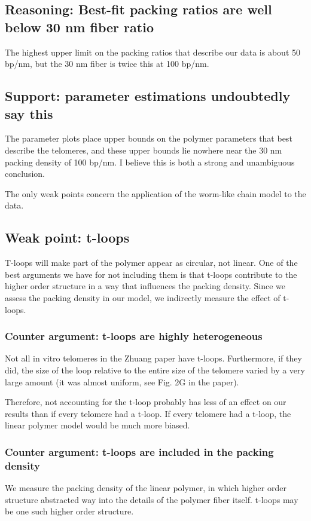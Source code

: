 \documentclass[12pt, a4paper]{article}
\begin{document}
\subsection{Reasoning: Best-fit packing ratios are well below 30 nm fiber ratio}
\label{sec-3-1}
The highest upper limit on the packing ratios that describe our
data is about 50 bp/nm, but the 30 nm fiber is twice this at 100
bp/nm.
\subsection{Support: parameter estimations undoubtedly say this}
\label{sec-3-2}
The parameter plots place upper bounds on the polymer parameters
that best describe the telomeres, and these upper bounds lie
nowhere near the 30 nm packing density of 100 bp/nm. I believe this
is both a strong and unambiguous conclusion.

The only weak points concern the application of the worm-like chain
model to the data.

\subsection{Weak point: t-loops}
\label{sec-3-3}
T-loops will make part of the polymer appear as circular, not
linear. One of the best arguments we have for not including them is
that t-loops contribute to the higher order structure in a way that
influences the packing density. Since we assess the packing density
in our model, we indirectly measure the effect of t-loops.

\subsubsection{Counter argument: t-loops are highly heterogeneous}
\label{sec-3-3-1}
Not all in vitro telomeres in the Zhuang paper have
t-loops. Furthermore, if they did, the size of the loop relative
to the entire size of the telomere varied by a very large amount
(it was almost uniform, see Fig. 2G in the paper).

Therefore, not accounting for the t-loop probably has less of an
effect on our results than if every telomere had a t-loop. If
every telomere had a t-loop, the linear polymer model would be
much more biased.

\subsubsection{Counter argument: t-loops are included in the packing density}
\label{sec-3-3-2}
We measure the packing density of the linear polymer, in which
higher order structure abstracted way into the details of the
polymer fiber itself. t-loops may be one such higher order
structure.
\end{document}
